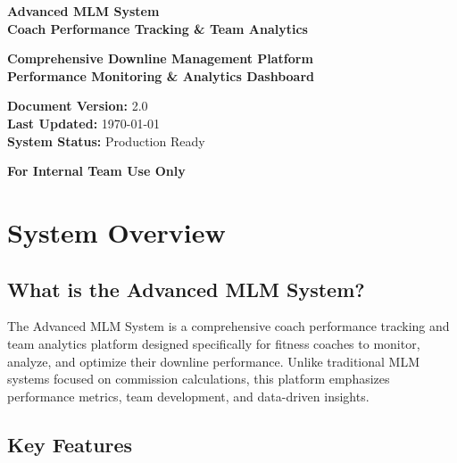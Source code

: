 \documentclass[12pt,a4paper]{article}
\begin{document}
\begin{titlepage}
    \centering
    \vspace*{2cm}
    
    {\Huge\bfseries\color{blue} Advanced MLM System}\\[0.5cm]
    {\Large\bfseries Coach Performance Tracking \& Team Analytics}\\[1cm]
    
    \vspace{1cm}
    
    {\large\textbf{Comprehensive Downline Management Platform}}\\[0.5cm]
    {\large\textbf{Performance Monitoring \& Analytics Dashboard}}\\[1cm]
    
    \vspace{2cm}
    
    {\large\textbf{Document Version:} 2.0}\\[0.5cm]
    {\large\textbf{Last Updated:} \today}\\[0.5cm]
    {\large\textbf{System Status:} Production Ready}\\[1cm]
    
    \vfill
    
    {\large\textbf{For Internal Team Use Only}}
\end{titlepage}

\tableofcontents
\newpage

\section{System Overview}

\subsection{What is the Advanced MLM System?}

The Advanced MLM System is a comprehensive coach performance tracking and team analytics platform designed specifically for fitness coaches to monitor, analyze, and optimize their downline performance. Unlike traditional MLM systems focused on commission calculations, this platform emphasizes performance metrics, team development, and data-driven insights.

\subsection{Key Features}
\end{document}
